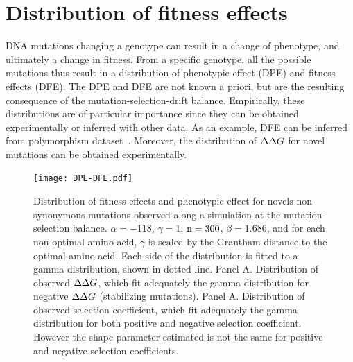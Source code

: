 \section{Distribution of fitness effects}
DNA mutations changing a genotype can result in a change of phenotype, and ultimately a change in fitness.
From a specific genotype, all the possible mutations thus result in a distribution of phenotypic effect (DPE) and fitness effects (\acrshort{DFE}).
The DPE and \acrshort{DFE} are not known a priori, but are the resulting consequence of the mutation-selection-drift balance.
Empirically, these distributions are of particular importance since they can be obtained experimentally or inferred with other data.
As an example, \acrshort{DFE} can be inferred from polymorphism dataset~\citep{Eyre-walker2007, Galtier2016}.
Moreover, the distribution of $\Delta \Delta G$ for novel mutations can be obtained experimentally.

\begin{figure}[H]
	\centering
	\texttt{[image: DPE-DFE.pdf]}
	\caption[Distribution of fitness effects and phenotypic effect]{
	Distribution of fitness effects and phenotypic effect for novels non-synonymous mutations observed along a simulation at the mutation-selection balance.
	$\alpha=-118$, $\gamma=1$, $\text{n}=300$, $\beta=1.686$, and for each non-optimal amino-acid, $\gamma$ is scaled by the Grantham distance to the optimal amino-acid.
	Each side of the distribution is fitted to a gamma distribution, shown in dotted line.
	Panel A. Distribution of observed $\Delta \Delta G$, which fit adequately the gamma distribution for negative $\Delta \Delta G$ (stabilizing mutations).
	Panel A. Distribution of observed selection coefficient, which fit adequately the gamma distribution for both positive and negative selection coefficient. However the shape parameter estimated is not the same for positive and negative selection coefficients.
	}
\end{figure}